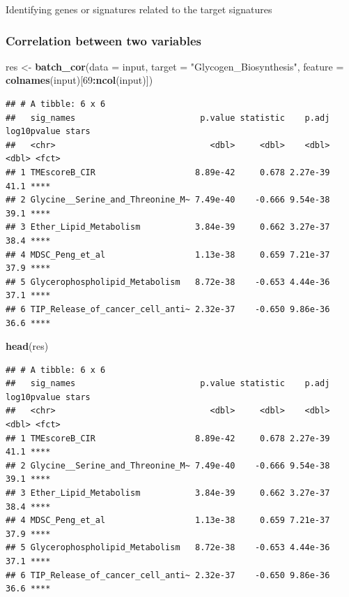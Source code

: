 \documentclass[
  12pt,
]{book}
\newenvironment{Shaded}{\begin{snugshade}}{\end{snugshade}}
\newcommand{\AttributeTok}[1]{\textcolor[rgb]{0.13,0.29,0.53}{#1}}
\newcommand{\DecValTok}[1]{\textcolor[rgb]{0.00,0.00,0.81}{#1}}
\newcommand{\FunctionTok}[1]{\textcolor[rgb]{0.13,0.29,0.53}{\textbf{#1}}}
\newcommand{\NormalTok}[1]{#1}
\newcommand{\OtherTok}[1]{\textcolor[rgb]{0.56,0.35,0.01}{#1}}
\newcommand{\SpecialCharTok}[1]{\textcolor[rgb]{0.81,0.36,0.00}{\textbf{#1}}}
\newcommand{\StringTok}[1]{\textcolor[rgb]{0.31,0.60,0.02}{#1}}
\begin{document}
Identifying genes or signatures related to the target signatures

\hypertarget{correlation-between-two-variables}{%
\subsubsection{Correlation between two variables}\label{correlation-between-two-variables}}

\begin{Shaded}
\begin{Highlighting}[]
\NormalTok{res }\OtherTok{\textless{}{-}} \FunctionTok{batch\_cor}\NormalTok{(}\AttributeTok{data =}\NormalTok{ input, }\AttributeTok{target =} \StringTok{"Glycogen\_Biosynthesis"}\NormalTok{, }\AttributeTok{feature =} \FunctionTok{colnames}\NormalTok{(input)[}\DecValTok{69}\SpecialCharTok{:}\FunctionTok{ncol}\NormalTok{(input)])}
\end{Highlighting}
\end{Shaded}

\begin{verbatim}
## # A tibble: 6 x 6
##   sig_names                         p.value statistic    p.adj log10pvalue stars
##   <chr>                               <dbl>     <dbl>    <dbl>       <dbl> <fct>
## 1 TMEscoreB_CIR                    8.89e-42     0.678 2.27e-39        41.1 **** 
## 2 Glycine__Serine_and_Threonine_M~ 7.49e-40    -0.666 9.54e-38        39.1 **** 
## 3 Ether_Lipid_Metabolism           3.84e-39     0.662 3.27e-37        38.4 **** 
## 4 MDSC_Peng_et_al                  1.13e-38     0.659 7.21e-37        37.9 **** 
## 5 Glycerophospholipid_Metabolism   8.72e-38    -0.653 4.44e-36        37.1 **** 
## 6 TIP_Release_of_cancer_cell_anti~ 2.32e-37    -0.650 9.86e-36        36.6 ****
\end{verbatim}

\begin{Shaded}
\begin{Highlighting}[]
\FunctionTok{head}\NormalTok{(res)}
\end{Highlighting}
\end{Shaded}

\begin{verbatim}
## # A tibble: 6 x 6
##   sig_names                         p.value statistic    p.adj log10pvalue stars
##   <chr>                               <dbl>     <dbl>    <dbl>       <dbl> <fct>
## 1 TMEscoreB_CIR                    8.89e-42     0.678 2.27e-39        41.1 **** 
## 2 Glycine__Serine_and_Threonine_M~ 7.49e-40    -0.666 9.54e-38        39.1 **** 
## 3 Ether_Lipid_Metabolism           3.84e-39     0.662 3.27e-37        38.4 **** 
## 4 MDSC_Peng_et_al                  1.13e-38     0.659 7.21e-37        37.9 **** 
## 5 Glycerophospholipid_Metabolism   8.72e-38    -0.653 4.44e-36        37.1 **** 
## 6 TIP_Release_of_cancer_cell_anti~ 2.32e-37    -0.650 9.86e-36        36.6 ****
\end{verbatim}
\end{document}
